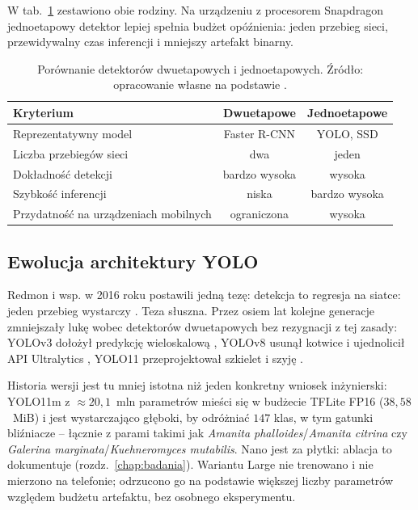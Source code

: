W tab.~\ref{tab:detektory} zestawiono obie rodziny. Na urządzeniu z procesorem Snapdragon jednoetapowy detektor lepiej spełnia budżet opóźnienia: jeden przebieg sieci, przewidywalny czas inferencji i mniejszy artefakt binarny.

\begin{table}[h!]
 \centering
 \caption{Porównanie detektorów dwuetapowych i jednoetapowych. Źródło: opracowanie własne na podstawie \cite{ren2015fasterrcnn, redmon2016yolo, liu2016ssd}.}
 \label{tab:detektory}
 \begin{tabular}{|l|c|c|}
 \hline
 \textbf{Kryterium} & \textbf{Dwuetapowe} & \textbf{Jednoetapowe} \\
 \hline \hline
 Reprezentatywny model & Faster R-CNN & YOLO, SSD \\
 \hline
 Liczba przebiegów sieci & dwa & jeden \\
 \hline
 Dokładność detekcji & bardzo wysoka & wysoka \\
 \hline
 Szybkość inferencji & niska & bardzo wysoka \\
 \hline
 Przydatność na urządzeniach mobilnych & ograniczona & wysoka \\
 \hline
 \end{tabular}
\end{table}

\subsection{Ewolucja architektury YOLO}
Redmon i wsp. w 2016 roku postawili jedną tezę: detekcja to regresja na siatce: jeden przebieg wystarczy \cite{redmon2016yolo}. Teza słuszna. Przez osiem lat kolejne generacje zmniejszały lukę wobec detektorów dwuetapowych bez rezygnacji z tej zasady: YOLOv3 dołożył predykcję wieloskalową \cite{redmon2018yolov3}, YOLOv8 usunął kotwice i ujednolicił API Ultralytics \cite{ultralytics2023yolov8}, YOLO11 przeprojektował szkielet i szyję \cite{ultralytics2024yolo11}.

Historia wersji jest tu mniej istotna niż jeden konkretny wniosek inżynierski: YOLO11m z $\approx20{,}1$~mln parametrów mieści się w budżecie TFLite FP16 ($38{,}58$~MiB) i jest wystarczająco głęboki, by odróżniać $147$ klas, w tym gatunki bliźniacze – łącznie z parami takimi jak \textit{Amanita phalloides}/\textit{Amanita citrina} czy \textit{Galerina marginata}/\textit{Kuehneromyces mutabilis}. Nano jest za płytki: ablacja to dokumentuje (rozdz.~\ref{chap:badania}). Wariantu Large nie trenowano i nie mierzono na telefonie; odrzucono go na podstawie większej liczby parametrów względem budżetu artefaktu, bez osobnego eksperymentu.

